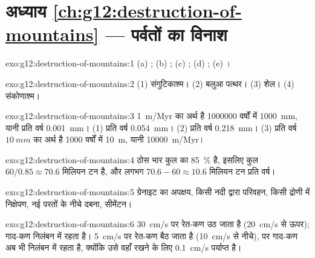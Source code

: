 \section*{अध्याय \ref{ch:g12:destruction-of-mountains} --- पर्वतों का विनाश}

\begin{solution}{exo:g12:destruction-of-mountains:1}
(a) ; (b) ; (c) ;
(d) ; (e) ।
\end{solution}

\begin{solution}{exo:g12:destruction-of-mountains:2}
(1) संगुटिकाश्म। (2) बलुआ पत्थर। (3) शेल। (4) संकोणाश्म।
\end{solution}

\begin{solution}{exo:g12:destruction-of-mountains:3}
\qty{1}{m/Myr} का अर्थ है \num{1000000} वर्षों में \qty{1000}{mm}, यानी प्रति वर्ष \qty{0.001}{mm}।
(1) प्रति वर्ष \qty{0.054}{mm}। (2) प्रति वर्ष \qty{0.218}{mm}।
(3) प्रति वर्ष $\qty{10}{mm}$ का अर्थ है 1000 वर्षों में \qty{10}{m}, यानी \qty{10000}{m/Myr}।
\end{solution}

\begin{solution}{exo:g12:destruction-of-mountains:4}
ठोस भार कुल का \qty{85}{\percent} है, इसलिए कुल $60/0.85
\approx 70.6$ मिलियन टन है, और  लगभग $70.6 - 60 \approx
10.6$ मिलियन टन प्रति वर्ष।
\end{solution}

\begin{solution}{exo:g12:destruction-of-mountains:5}
ग्रेनाइट का अपक्षय, किसी नदी द्वारा परिवहन, किसी द्रोणी में निक्षेपण,
नई परतों के नीचे दबना, सीमेंटन।
\end{solution}

\begin{solution}{exo:g12:destruction-of-mountains:6}
\qty{30}{cm/s} पर रेत-कण उठ जाता है (\qty{20}{cm/s} से ऊपर);
गाद-कण निलंबन में रहता है। \qty{5}{cm/s} पर रेत-कण बैठ जाता है
(\qty{10}{cm/s} से नीचे), पर गाद-कण अब भी निलंबन में रहता है, क्योंकि
उसे वहाँ रखने के लिए \qty{0.1}{cm/s} पर्याप्त है।
\end{solution}

